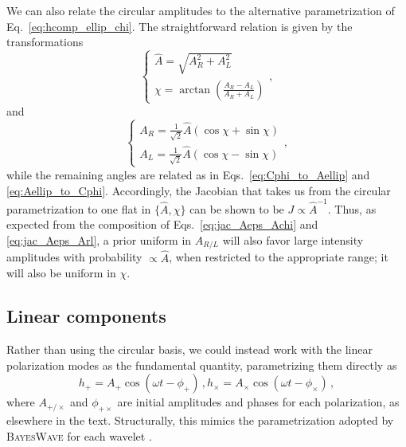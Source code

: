 \documentclass[aps,prd,twocolumn,superscriptaddress,preprintnumbers,floatfix,nofootinbib]{revtex4-2}
\newcommand*{\eq}[1]{Eq.~\eqref{eq:#1}}
\begin{document}
We can also relate the circular amplitudes to the alternative parametrization of \eq{hcomp_ellip_chi}.
The straightforward relation is given by the transformations
\begin{equation} \label{eq:Cphi_to_Ahatchi}
\begin{cases}
\hat{A} = \sqrt{A_R^2 + A_L^2} \\
\chi = \arctan\left( \frac{A_R - A_L}{A_R + A_L}\right)
\end{cases} ,
\end{equation}
and
\begin{equation} \label{eq:Cphi_to_Ahatchi}
\begin{cases}
A_R = \frac{1}{\sqrt{2}} \hat{A} \left(\cos\chi + \sin \chi\right) \\
A_L = \frac{1}{\sqrt{2}} \hat{A} \left(\cos\chi - \sin \chi\right)
\end{cases} ,
\end{equation}
while the remaining angles are related as in Eqs.~\eqref{eq:Cphi_to_Aellip} and \eqref{eq:Aellip_to_Cphi}.
Accordingly, the Jacobian that takes us from the circular parametrization to one flat in $\{\hat{A},\chi\}$ can be shown to be $J \propto \hat{A}^{-1}$.
Thus, as expected from the composition of Eqs.~\eqref{eq:jac_Aeps_Achi} and \eqref{eq:jac_Aeps_Arl}, a prior uniform in $A_{R/L}$ will also favor large intensity amplitudes with probability $\propto \hat{A}$, when restricted to the appropriate range; it will also be uniform in $\chi$.


\subsection{Linear components}
\label{sec:jac:Apc}

Rather than using the circular basis, we could instead work with the linear polarization modes as the fundamental quantity, parametrizing them directly as
\begin{subequations} \label{eq:Aphi}
\begin{equation}
h_+ = A_+ \cos (\omega t - \phi_+)\, ,
\end{equation}
\begin{equation}
h_\times = A_\times \cos (\omega t - \phi_\times) \, ,
\end{equation}
\end{subequations}
where $A_{+/\times}$ and $\phi_{+\times}$ are initial amplitudes and phases for each polarization, as elsewhere in the text.
Structurally, this mimics the parametrization adopted by \textsc{BayesWave} for each wavelet \cite{Cornish:2020dwh}.
\end{document}
